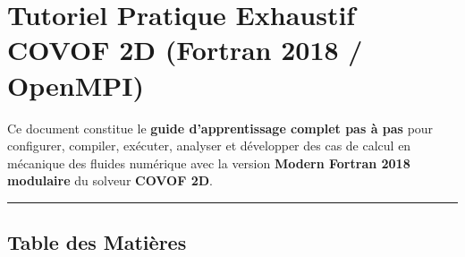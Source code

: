 \documentclass[
  french,
]{article}
\author{}
\date{}
\begin{document}
\section{Tutoriel Pratique Exhaustif COVOF 2D (Fortran 2018 /
OpenMPI)}\label{tutoriel-pratique-exhaustif-covof-2d-fortran-2018-openmpi}

Ce document constitue le \textbf{guide d'apprentissage complet pas à
pas} pour configurer, compiler, exécuter, analyser et développer des cas
de calcul en mécanique des fluides numérique avec la version
\textbf{Modern Fortran 2018 modulaire} du solveur \textbf{COVOF 2D}.

\begin{center}\rule{0.5\linewidth}{0.5pt}\end{center}

\subsection{Table des Matières}\label{table-des-matiuxe8res}
\end{document}
